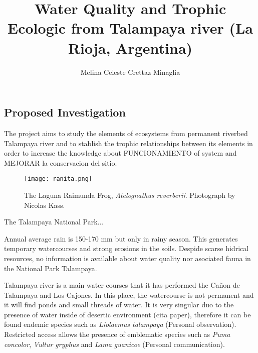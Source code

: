 \documentclass[11pt,a4paper,oneside]{article}
\title{Water Quality and Trophic Ecologic from Talampaya river (La Rioja, Argentina)}
\date{}
\author{Melina Celeste Crettaz Minaglia}
\begin{document}

\maketitle
\subsection*{Proposed Investigation}
The project aims to study the elements of ecosystems from permanent riverbed Talampaya river and to stablish the trophic relationships between its elements in order to increase the knowledge about FUNCIONAMIENTO of system and MEJORAR la conservacion del sitio. 

\bigskip
\begin{figure}[h] %
\centering
\texttt{[image: ranita.png]}
\caption{The Laguna Raimunda Frog, \textit{Atelognathus reverberii}. Photograph by Nicolas Kass.}
\end{figure}
\bigksip

The Talampaya National Park...

Annual average rain is 150-170 mm but only in rainy season. This generates temporary watercourses and strong erosions in the soils. Despide scarse hidrical resources, no information is available about water quality nor asociated fauna in the National Park Talampaya. 

Talampaya river is a main water courses that it has performed the Cañon de Talampaya and Los Cajones. In this place, the watercourse is not permanent and it will find ponds and small threads of water. It is very singular duo to the presence of water inside of desertic environment (cita paper), therefore it can be found endemic species such as \textit{Liolaemus talampaya} (Personal observation). Restricted access allows the presence of emblematic species such as \textit{Puma concolor}, \textit{Vultur gryphus} and \textit{Lama guanicoe} (Personal communication).
\end{document}
